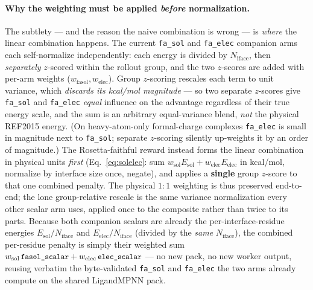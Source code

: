 \documentclass[11pt]{article}
\newcommand{\ttk}[1]{\texttt{\small #1}}
\begin{document}
\paragraph{Why the weighting must be applied \emph{before} normalization.} The subtlety --- and the
reason the naive combination is wrong --- is \emph{where} the linear combination happens. The current
\ttk{fa\_sol} and \ttk{fa\_elec} companion arms each self-normalize independently: each energy is
divided by $N_{\mathrm{iface}}$, then \emph{separately} $z$-scored within the rollout group, and the two
$z$-scores are added with per-arm weights ($w_{\mathrm{fasol}},w_{\mathrm{elec}}$). Group $z$-scoring
rescales each term to unit variance, which \emph{discards its kcal/mol magnitude} --- so two separate
$z$-scores give \ttk{fa\_sol} and \ttk{fa\_elec} \emph{equal} influence on the advantage regardless of
their true energy scale, and the sum is an arbitrary equal-variance blend, \emph{not} the physical
REF2015 energy. (On heavy-atom-only formal-charge complexes \ttk{fa\_elec} is small in magnitude next
to \ttk{fa\_sol}; separate $z$-scoring silently up-weights it by an order of magnitude.) The
Rosetta-faithful reward instead forms the linear combination in physical units \emph{first}
(Eq.\ \ref{eq:solelec}: sum $w_{\mathrm{sol}}E_{\mathrm{sol}}+w_{\mathrm{elec}}E_{\mathrm{elec}}$ in
kcal/mol, normalize by interface size once, negate), and applies a \textbf{single} group $z$-score to
that one combined penalty. The physical $1{:}1$ weighting is thus preserved end-to-end; the lone
group-relative rescale is the same variance normalization every other scalar arm uses, applied once to
the composite rather than twice to its parts. Because both companion scalars are already the
per-interface-residue energies $E_{\mathrm{sol}}/N_{\mathrm{iface}}$ and
$E_{\mathrm{elec}}/N_{\mathrm{iface}}$ (divided by the \emph{same} $N_{\mathrm{iface}}$), the combined
per-residue penalty is simply their weighted sum
$w_{\mathrm{sol}}\,\ttk{fasol\_scalar}+w_{\mathrm{elec}}\,\ttk{elec\_scalar}$ --- no new pack, no new
worker output, reusing verbatim the byte-validated \ttk{fa\_sol} and \ttk{fa\_elec} the two arms
already compute on the shared LigandMPNN pack.
\end{document}
